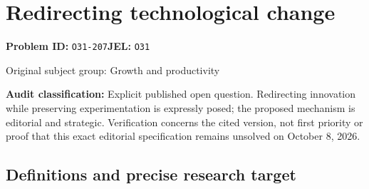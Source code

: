 \documentclass[11pt,a4paper]{article}
\begin{document}
\section*{Redirecting technological change}
\textbf{Problem ID:} \texttt{O31-207}\quad \textbf{JEL:} \texttt{O31}\par
\label{problem:OP-0270}
{\sffamily\small\color{muted}Original subject group: Growth and productivity\par}
\label{definitions:problem:30007551}
\textbf{Audit classification:} Explicit published open question. Redirecting innovation while preserving experimentation is expressly posed; the proposed mechanism is editorial and strategic. Verification concerns the cited version, not first priority or proof that this exact editorial specification remains unsolved on October 8, 2026.
\subsection*{Definitions and precise research target}
\end{document}
